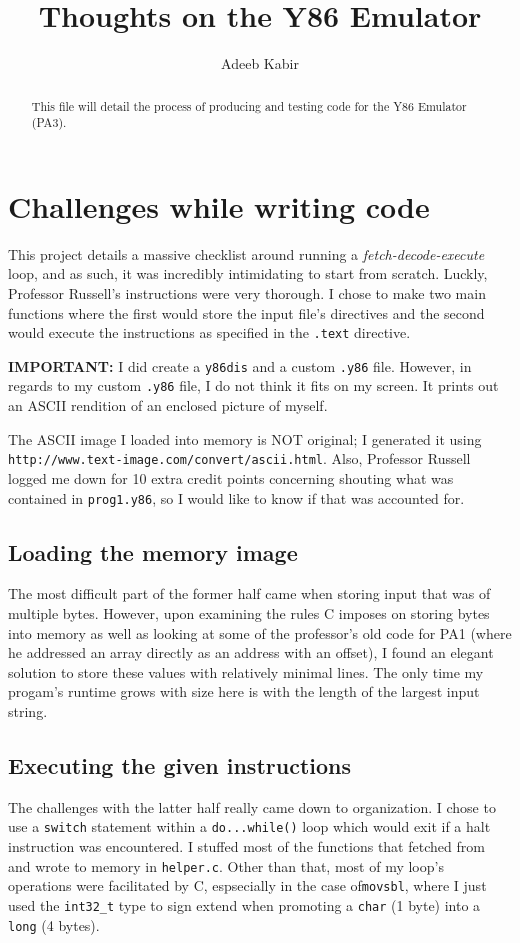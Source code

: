 \documentclass{article}
\begin{document}
\title{Thoughts on the Y86 Emulator}
\author{Adeeb Kabir}
\maketitle

\begin{abstract}
This file will detail the process of producing and testing code for the Y86 Emulator (PA3).
\end{abstract}

\section{Challenges while writing code}
This project details a massive checklist around running a \textit{fetch-decode-execute} loop, and as such, it was incredibly intimidating to start from scratch.  Luckly, Professor Russell's
instructions were very thorough.  I chose to make two main functions where the first would store the input file's directives and
the second would execute the instructions as specified in the \verb#.text# directive.

\textbf{IMPORTANT:} I did create a \verb#y86dis# and a custom \verb#.y86# file.  However, in regards to my custom \verb#.y86#
file, I do not think it fits on my screen.  It
prints out an ASCII rendition of an enclosed picture of myself.  

The ASCII image I loaded into memory is NOT original; I generated it using
\verb#http://www.text-image.com/convert/ascii.html#. Also, Professor Russell logged me down for 10 extra credit points
concerning shouting what was contained in \verb#prog1.y86#, so I would like to know if that was accounted for.

\subsection{Loading the memory image}
The most difficult part of the former half came when storing input that was of multiple bytes.  However, upon examining the rules
C imposes on storing bytes into memory as well as looking at some of the professor's old code for PA1 (where he addressed an array
directly as an address with an offset), I found an elegant solution to store these values with relatively minimal lines.  The only
time my progam's runtime grows with size here is with the length of the largest input string.

\subsection{Executing the given instructions}
The challenges with the latter half really came down to organization.  I chose to use a \verb#switch# statement within a
\verb#do...while()# loop which would exit if a halt instruction was encountered.  I stuffed most of the functions that fetched
from and
wrote to memory in \verb#helper.c#.  Other than that, most of my loop's operations were facilitated by C, espsecially in the case
of\verb#movsbl#, where I
just used the \verb#int32_t# type to sign extend when promoting a \verb#char# (1 byte) into a \verb#long# (4 bytes).
\end{document}
